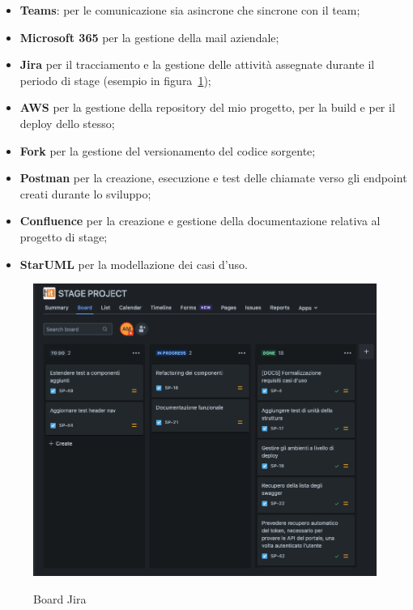 \begin{itemize}
  \item \textbf{Teams}: per le comunicazione sia asincrone che sincrone con il team;
  \item \textbf{Microsoft 365} per la gestione della mail aziendale;
  \item \textbf{Jira} per il tracciamento e la gestione delle attività assegnate durante il periodo di stage (esempio in figura~\ref{fig:board-jira});
  \item \textbf{AWS} per la gestione della repository del mio progetto, per la build e per il deploy dello stesso;
  \item \textbf{Fork} per la gestione del versionamento del codice sorgente;
  \item \textbf{Postman} per la creazione, esecuzione e test delle chiamate verso gli endpoint creati durante lo sviluppo;
  \item \textbf{Confluence} per la creazione e gestione della documentazione relativa al progetto di stage;
  \item \textbf{StarUML} per la modellazione dei casi d'uso.
\end{itemize}

\begin{figure}[!ht] 
  \centering 
  \includegraphics[width=0.9\columnwidth, alt={Esempio di utilizzo della board di Jira}]{images/Board.jpg}
  \caption{Board Jira}\label{fig:board-jira}
\end{figure}

